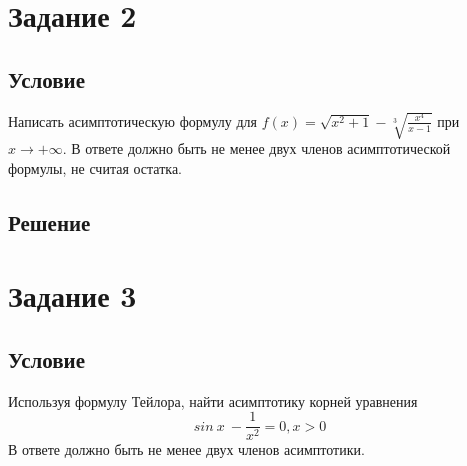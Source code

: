 \documentclass[a4paper, 14pt]{extarticle}
\begin{document}
\section{Задание 2}

\subsection{Условие}
Написать асимптотическую формулу для \(f(x) = \sqrt{x^2+1} - \sqrt[3]{\frac{x^4}{x-1}} \) при \(x \to +\infty\). В ответе должно быть не менее двух членов асимптотической формулы, не считая остатка. 

\subsection{Решение}


\newpage

\section{Задание 3}
\subsection{Условие}
Используя формулу Тейлора, найти асимптотику корней уравнения \[sin\: x \ - \frac{1}{x^2} = 0, x> 0\] В ответе должно быть не менее двух членов асимптотики.
\end{document}
